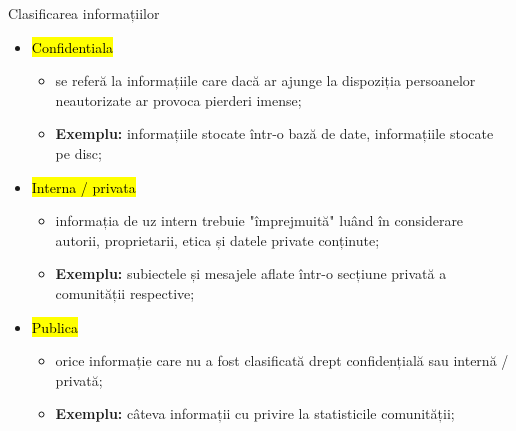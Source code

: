 \documentclass[9pt]{beamer}
\makeatletter
\newcommand\SoulColor{%
  \let\set@color\beamerorig@set@color
  \let\reset@color\beamerorig@reset@color}
\makeatother
\begin{document}
\begin{frame}{Clasificarea informațiilor}
\begin{itemize}
    \item \Large{\SoulColor\hl{Confidentiala}}
    \begin{itemize}
		\vskip5pt
		\item se referă la informațiile care dacă ar ajunge la dispoziția persoanelor neautorizate ar provoca pierderi imense;
		\vskip5pt
		\item \textbf{Exemplu:} informațiile stocate într-o bază de date, informațiile stocate pe disc;
	\end{itemize}
	\vskip10pt
	\item \Large{\SoulColor\hl{Interna / privata}}
    \begin{itemize}
		\vskip5pt
		\item informația de uz intern trebuie "împrejmuită" luând în considerare autorii, proprietarii, etica și datele private conținute;
		\vskip5pt
		\item \textbf{Exemplu:} subiectele și mesajele aflate într-o secțiune privată a comunității respective;
	\end{itemize}
	\item \Large{\SoulColor\hl{Publica}}
    \begin{itemize}
		\vskip5pt
		\item orice informație care nu a fost clasificată drept confidențială sau internă / privată;
		\vskip5pt
		\item \textbf{Exemplu:} câteva informații cu privire la statisticile comunității;
	\end{itemize}
\end{itemize}
\end{frame}
\end{document}
